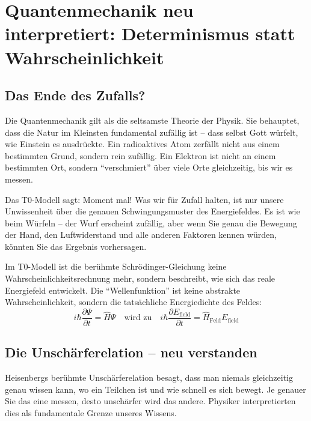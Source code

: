 \documentclass[12pt,a4paper]{article}
\newcommand{\Efield}{E_\text{field}}
\begin{document}
	\section{Quantenmechanik neu interpretiert: Determinismus statt Wahrscheinlichkeit}
	
	\subsection{Das Ende des Zufalls?}
	
	Die Quantenmechanik gilt als die seltsamste Theorie der Physik. Sie behauptet, dass die Natur im Kleinsten fundamental zufällig ist -- dass selbst Gott würfelt, wie Einstein es ausdrückte. Ein radioaktives Atom zerfällt nicht aus einem bestimmten Grund, sondern rein zufällig. Ein Elektron ist nicht an einem bestimmten Ort, sondern ``verschmiert'' über viele Orte gleichzeitig, bis wir es messen.
	
	Das T0-Modell sagt: Moment mal! Was wir für Zufall halten, ist nur unsere Unwissenheit über die genauen Schwingungsmuster des Energiefeldes. Es ist wie beim Würfeln -- der Wurf erscheint zufällig, aber wenn Sie genau die Bewegung der Hand, den Luftwiderstand und alle anderen Faktoren kennen würden, könnten Sie das Ergebnis vorhersagen.
	
	\begin{quantum}
		Im T0-Modell ist die berühmte Schrödinger-Gleichung keine Wahrscheinlichkeitsrechnung mehr, sondern beschreibt, wie sich das reale Energiefeld entwickelt. Die ``Wellenfunktion'' ist keine abstrakte Wahrscheinlichkeit, sondern die tatsächliche Energiedichte des Feldes:
		\begin{equation}
			i\hbar \frac{\partial \Psi}{\partial t} = \hat{H}\Psi \quad \text{wird zu} \quad i\hbar \frac{\partial \Efield}{\partial t} = \hat{H}_{\text{Feld}}\Efield
		\end{equation}
	\end{quantum}
	
	\subsection{Die Unschärferelation -- neu verstanden}
	
	Heisenbergs berühmte Unschärferelation besagt, dass man niemals gleichzeitig genau wissen kann, wo ein Teilchen ist und wie schnell es sich bewegt. Je genauer Sie das eine messen, desto unschärfer wird das andere. Physiker interpretierten dies als fundamentale Grenze unseres Wissens.
	
\end{document}
